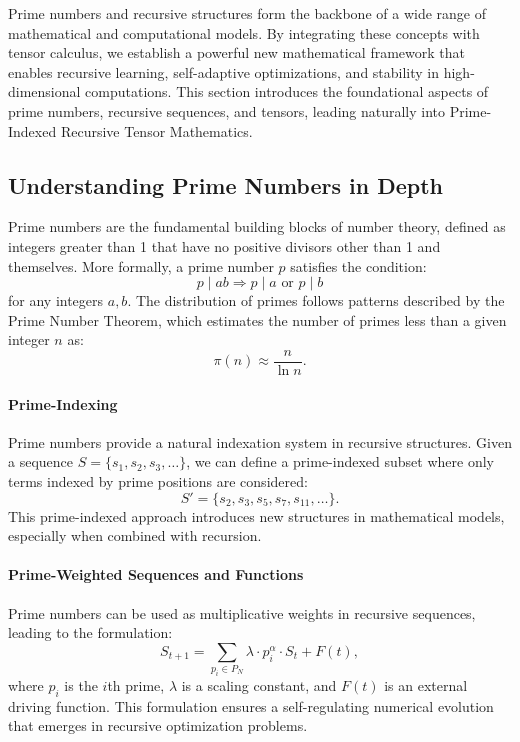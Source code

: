 \documentclass{article}
\theoremstyle{plain}
\begin{document}
Prime numbers and recursive structures form the backbone of a wide range of mathematical and computational models. By integrating these concepts with tensor calculus, we establish a powerful new mathematical framework that enables recursive learning, self-adaptive optimizations, and stability in high-dimensional computations. This section introduces the foundational aspects of prime numbers, recursive sequences, and tensors, leading naturally into Prime-Indexed Recursive Tensor Mathematics.

\subsection{Understanding Prime Numbers in Depth}

Prime numbers are the fundamental building blocks of number theory, defined as integers greater than 1 that have no positive divisors other than 1 and themselves. More formally, a prime number \( p \) satisfies the condition:
\[
p \mid ab \Rightarrow p \mid a \text{ or } p \mid b
\]
for any integers \( a, b \). The distribution of primes follows patterns described by the Prime Number Theorem, which estimates the number of primes less than a given integer \( n \) as:
\[
\pi(n) \approx \frac{n}{\ln n}.
\]

\paragraph{Prime-Indexing}
Prime numbers provide a natural indexation system in recursive structures. Given a sequence \( S = \{s_1, s_2, s_3, \dots\} \), we can define a prime-indexed subset where only terms indexed by prime positions are considered:
\[
S' = \{ s_2, s_3, s_5, s_7, s_{11}, \dots \}.
\]
This prime-indexed approach introduces new structures in mathematical models, especially when combined with recursion.

\paragraph{Prime-Weighted Sequences and Functions}
Prime numbers can be used as multiplicative weights in recursive sequences, leading to the formulation:
\[
S_{t+1} = \sum_{p_i \in P_N} \lambda \cdot p_i^\alpha \cdot S_t + F(t),
\]
where \( p_i \) is the \( i \)th prime, \( \lambda \) is a scaling constant, and \( F(t) \) is an external driving function. This formulation ensures a self-regulating numerical evolution that emerges in recursive optimization problems.
\end{document}
